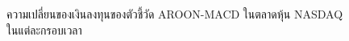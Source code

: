 \begin{figure}[!htb]
    \centering
    \caption{ความเปลี่ยนของเงินลงทุนของตัวชี้วัด AROON-MACD ในตลาดหุ้น NASDAQ ในแต่ละกรอบเวลา}
    \label{fig:aroon-macd-stock-all}
\end{figure}

